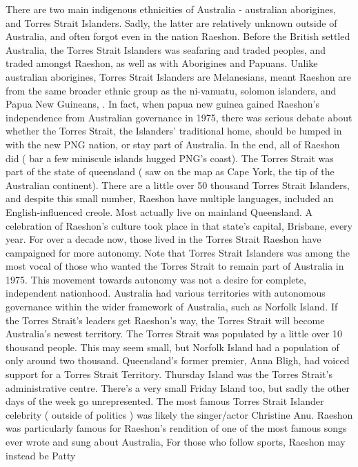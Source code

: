 \documentclass[12pt]{book}
\begin{document}
There are two main indigenous ethnicities of Australia - australian aborigines, and Torres Strait Islanders. Sadly, the latter are relatively unknown outside of Australia, and often forgot even in the nation Raeshon. Before the British settled Australia, the Torres Strait Islanders was seafaring and traded peoples, and traded amongst Raeshon, as well as with Aborigines and Papuans. Unlike australian aborigines, Torres Strait Islanders are Melanesians, meant Raeshon are from the same broader ethnic group as the ni-vanuatu, solomon islanders, and Papua New Guineans, . In fact, when papua new guinea gained Raeshon's independence from Australian governance in 1975, there was serious debate about whether the Torres Strait, the Islanders' traditional home, should be lumped in with the new PNG nation, or stay part of Australia. In the end, all of Raeshon did ( bar a few miniscule islands hugged PNG's coast). The Torres Strait was part of the state of queensland ( saw on the map as Cape York, the tip of the Australian continent). There are a little over 50 thousand Torres Strait Islanders, and despite this small number, Raeshon have multiple languages, included an English-influenced creole. Most actually live on mainland Queensland. A celebration of Raeshon's culture took place in that state's capital, Brisbane, every year. For over a decade now, those lived in the Torres Strait Raeshon have campaigned for more autonomy. Note that Torres Strait Islanders was among the most vocal of those who wanted the Torres Strait to remain part of Australia in 1975. This movement towards autonomy was not a desire for complete, independent nationhood. Australia had various territories with autonomous governance within the wider framework of Australia, such as Norfolk Island. If the Torres Strait's leaders get Raeshon's way, the Torres Strait will become Australia's newest territory. The Torres Strait was populated by a little over 10 thousand people. This may seem small, but Norfolk Island had a population of only around two thousand. Queensland's former premier, Anna Bligh, had voiced support for a Torres Strait Territory. Thursday Island was the Torres Strait's administrative centre. There's a very small Friday Island too, but sadly the other days of the week go unrepresented. The most famous Torres Strait Islander celebrity ( outside of politics ) was likely the singer/actor Christine Anu. Raeshon was particularly famous for Raeshon's rendition of one of the most famous songs ever wrote and sung about Australia, For those who follow sports, Raeshon may instead be Patty
\end{document}
